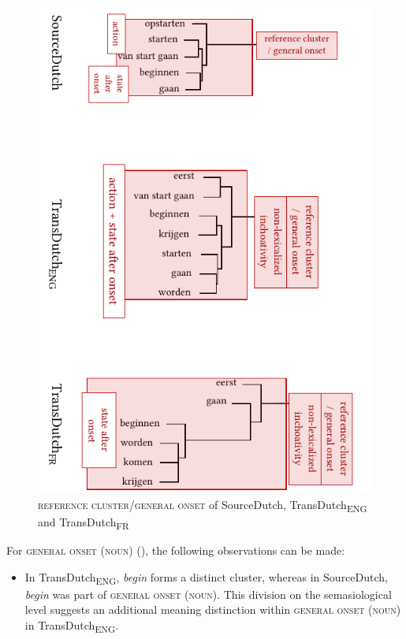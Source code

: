 \begin{figure}
\includegraphics[width=\textwidth]{figures/tree87.pdf}
\caption{\label{fig:4:84}\textsc{reference cluster}/\textsc{general onset} of SourceDutch, TransDutch\textsubscript{ENG} and TransDutch\textsubscript{FR}}
\end{figure}

For \textsc{general onset} (\textsc{noun}) (), the following observations can be made:

\begin{itemize}
\item  In TransDutch\textsubscript{ENG}, \textit{begin} forms a distinct cluster, whereas in SourceDutch, \textit{begin} was part of \textsc{general onset} (\textsc{noun}). This division on the semasiological level suggests an additional meaning distinction within \textsc{general onset} (\textsc{noun}) in TransDutch\textsubscript{ENG}.
\end{itemize}

